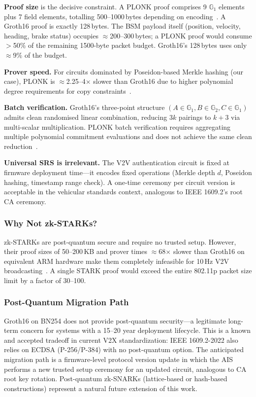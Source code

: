 \textbf{Proof size} is the decisive constraint. A PLONK proof comprises 9
$\mathbb{G}_1$ elements plus 7 field elements, totalling 500--1000\,bytes depending
on encoding~\cite{roelink2024}. A Groth16 proof is exactly 128\,bytes. The BSM
payload itself (position, velocity, heading, brake status) occupies
$\approx$200--300\,bytes; a PLONK proof would consume $>$50\% of the remaining
1500-byte packet budget. Groth16's 128\,bytes uses only $\approx$9\% of the budget.

\textbf{Prover speed.} For circuits dominated by Poseidon-based Merkle hashing
(our case), PLONK is $\approx$2.25--4$\times$ slower than Groth16 due to higher
polynomial degree requirements for copy constraints~\cite{roelink2024}.

\textbf{Batch verification.} Groth16's three-point structure
$(A \in \mathbb{G}_1, B \in \mathbb{G}_2, C \in \mathbb{G}_1)$ admits clean
randomised linear combination, reducing $3k$ pairings to $k+3$ via multi-scalar
multiplication. PLONK batch verification requires aggregating multiple polynomial
commitment evaluations and does not achieve the same clean reduction~\cite{lipmaa2024polymath}.

\textbf{Universal SRS is irrelevant.} The V2V authentication circuit is fixed at
firmware deployment time---it encodes fixed operations (Merkle depth $d$, Poseidon
hashing, timestamp range check). A one-time ceremony per circuit version is
acceptable in the vehicular standards context, analogous to IEEE 1609.2's root CA
ceremony.

\subsubsection{Why Not zk-STARKs?}

zk-STARKs are post-quantum secure and require no trusted setup. However, their proof
sizes of 50--200\,KB and prover times $\approx$68$\times$ slower than Groth16 on
equivalent ARM hardware make them completely infeasible for 10\,Hz V2V
broadcasting~\cite{snark_stark_comparison2025}. A single STARK proof would exceed
the entire 802.11p packet size limit by a factor of 30--100.

\subsubsection{Post-Quantum Migration Path}

Groth16 on BN254 does not provide post-quantum security---a legitimate long-term
concern for systems with a 15--20 year deployment lifecycle. This is a known and
accepted tradeoff in current V2X standardization: IEEE 1609.2-2022 also relies on
ECDSA (P-256/P-384) with no post-quantum option. The anticipated migration path is
a firmware-level protocol version update in which the AIS performs a new trusted
setup ceremony for an updated circuit, analogous to CA root key rotation.
Post-quantum zk-SNARKs (lattice-based or hash-based constructions) represent a
natural future extension of this work.

